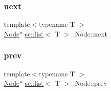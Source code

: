 \subsubsection{\texorpdfstring{next}{next}}
{\footnotesize\ttfamily template$<$typename T $>$ \\
\hyperlink{structsc_1_1list_1_1_node}{Node}$\ast$ \hyperlink{classsc_1_1list}{sc\+::list}$<$ T $>$\+::Node\+::next}

\mbox{\label{structsc_1_1list_1_1_node_a034da1a87dbe111bd4f72fe63838a31b}} 
\subsubsection{\texorpdfstring{prev}{prev}}
{\footnotesize\ttfamily template$<$typename T $>$ \\
\hyperlink{structsc_1_1list_1_1_node}{Node}$\ast$ \hyperlink{classsc_1_1list}{sc\+::list}$<$ T $>$\+::Node\+::prev}

